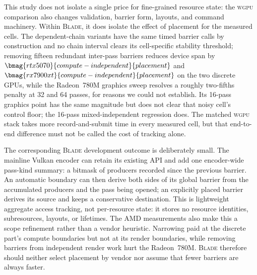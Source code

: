 \documentclass[10pt,twocolumn]{article}
\newcommand{\blade}{\textsc{Blade}}
\newcommand{\wgpu}{\textsc{wgpu}}
\begin{document}
This study does not isolate a single price for fine-grained resource state:
the \wgpu{} comparison also changes validation, barrier form, layouts, and
command machinery. Within \blade{}, it does isolate the effect of placement
for the measured cells.
The dependent-chain variants have the same timed barrier calls by construction
and no chain interval clears its cell-specific stability threshold; removing
fifteen redundant inter-pass barriers reduces device span by
$\bmag{rtx5070}{compute-independent}{placement}$ and
$\bmag{rx7900xt}{compute-independent}{placement}$ on the two discrete GPUs,
while the Radeon~780M graphics sweep resolves a roughly two-fifths penalty at
32 and 64 passes, for reasons we could not establish. Its 16-pass graphics
point has the same magnitude but does not clear that noisy cell's control
floor; the 16-pass mixed-independent regression does. The matched \wgpu{} stack
takes more record-and-submit time in every measured cell, but that end-to-end
difference must not be called the cost of tracking alone.

The corresponding \blade{} development outcome is deliberately small. The
mainline Vulkan encoder can retain its existing API and add one encoder-wide
pass-kind summary: a bitmask of producers recorded since the previous barrier.
An automatic boundary can then derive both sides of its global barrier from
the accumulated producers and the pass being opened; an explicitly placed
barrier derives its source and keeps a conservative destination. This is
lightweight aggregate access tracking, not per-resource state: it stores no
resource identities, subresources, layouts, or lifetimes. The AMD measurements
also make this a scope refinement rather than a vendor heuristic. Narrowing
paid at the discrete part's compute boundaries but not at its render
boundaries, while removing barriers from independent render work hurt the
Radeon~780M. \blade{} therefore should neither select placement by vendor nor
assume that fewer barriers are always faster.
\end{document}
